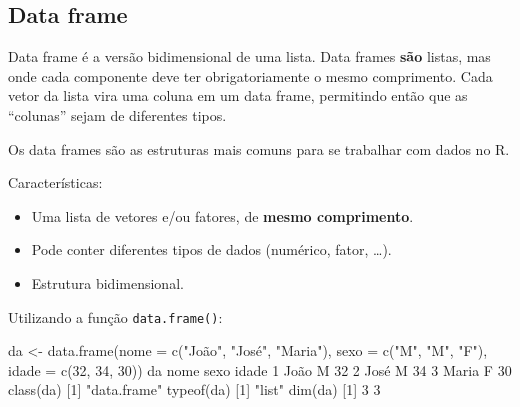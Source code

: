 \documentclass[
  10pt,
  a4paper]{book}
\newenvironment{Shaded}{\begin{snugshade}}{\end{snugshade}}
\newcommand{\AttributeTok}[1]{\textcolor[rgb]{0.77,0.63,0.00}{#1}}
\newcommand{\DecValTok}[1]{\textcolor[rgb]{0.00,0.00,0.81}{#1}}
\newcommand{\FunctionTok}[1]{\textcolor[rgb]{0.00,0.00,0.00}{#1}}
\newcommand{\NormalTok}[1]{#1}
\newcommand{\OtherTok}[1]{\textcolor[rgb]{0.56,0.35,0.01}{#1}}
\newcommand{\StringTok}[1]{\textcolor[rgb]{0.31,0.60,0.02}{#1}}
\providecommand{\tightlist}{%
  \setlength{\itemsep}{0pt}\setlength{\parskip}{0pt}}
\begin{document}
\hypertarget{data-frame}{%
\subsection{Data frame}\label{data-frame}}

Data frame é a versão bidimensional de uma lista. Data frames \textbf{são}
listas, mas onde cada componente deve ter obrigatoriamente o mesmo
comprimento. Cada vetor da lista vira uma coluna em um data frame,
permitindo então que as ``colunas'' sejam de diferentes tipos.

Os data frames são as estruturas mais comuns para se trabalhar com dados
no R.

Características:

\begin{itemize}
\tightlist
\item
  Uma lista de vetores e/ou fatores, de \textbf{mesmo comprimento}.
\item
  Pode conter diferentes tipos de dados (numérico, fator, \ldots).
\item
  Estrutura bidimensional.
\end{itemize}

Utilizando a função \texttt{data.frame()}:

\begin{Shaded}
\begin{Highlighting}[]
\NormalTok{da }\OtherTok{\textless{}{-}} \FunctionTok{data.frame}\NormalTok{(}\AttributeTok{nome =} \FunctionTok{c}\NormalTok{(}\StringTok{"João"}\NormalTok{, }\StringTok{"José"}\NormalTok{, }\StringTok{"Maria"}\NormalTok{),}
                 \AttributeTok{sexo =} \FunctionTok{c}\NormalTok{(}\StringTok{"M"}\NormalTok{, }\StringTok{"M"}\NormalTok{, }\StringTok{"F"}\NormalTok{),}
                 \AttributeTok{idade =} \FunctionTok{c}\NormalTok{(}\DecValTok{32}\NormalTok{, }\DecValTok{34}\NormalTok{, }\DecValTok{30}\NormalTok{))}
\NormalTok{da}
\NormalTok{   nome sexo idade}
\DecValTok{1}\NormalTok{  João    M    }\DecValTok{32}
\DecValTok{2}\NormalTok{  José    M    }\DecValTok{34}
\DecValTok{3}\NormalTok{ Maria    F    }\DecValTok{30}
\FunctionTok{class}\NormalTok{(da)}
\NormalTok{[}\DecValTok{1}\NormalTok{] }\StringTok{"data.frame"}
\FunctionTok{typeof}\NormalTok{(da)}
\NormalTok{[}\DecValTok{1}\NormalTok{] }\StringTok{"list"}
\FunctionTok{dim}\NormalTok{(da)}
\NormalTok{[}\DecValTok{1}\NormalTok{] }\DecValTok{3} \DecValTok{3}
\end{Highlighting}
\end{Shaded}
\end{document}

